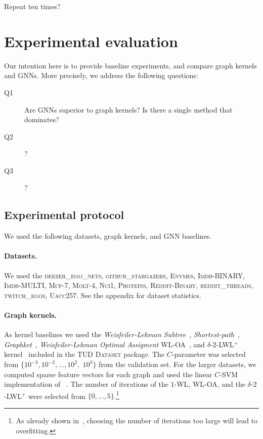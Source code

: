 \documentclass{article}
\theoremstyle{definition}
\newcommand{\new}[1]{\emph{#1}}
\begin{document}
Repeat ten times?



\section{Experimental evaluation}

Our intention here is to provide baseline experiments, and compare graph kernels and GNNs. More precisely, we address the following questions:
\begin{description}
	\item[Q1] Are GNNs superior to graph kernels? Is there a single method that dominates?
	\item[Q2] ?
	\item[Q3] ?
\end{description}

\subsection{Experimental protocol}

We used the following datasets, graph kernels, and GNN baselines.

\paragraph{Datasets.} We used the \textsc{deezer\_ego\_nets}, \textsc{github\_stargazers}, \textsc{Enymes},
\textsc{Imdb-BINARY}, \textsc{Imdb-MULTI}, \textsc{Mcf-7}, \textsc{Molt-4},	\textsc{Nci1}, \textsc{Proteins},
\textsc{Reddit-Binary},	\textsc{reddit\_threads}, \textsc{twitch\_egos}, \textsc{Uacc257}. See the appendix for dataset statistics.

\paragraph{Graph kernels.} As kernel baselines we used the \new{Weisfeiler-Lehman Subtree}~\cite{She+2011}, \new{Shortest-path}~\cite{Bor+2005}, \new{Graphket}~\cite{She+2009}, \new{Weisfeiler-Lehman Optimal Assigment} \textsc{WL-OA}~\cite{Kri+2016}, and $\delta$-$2$-LWL$^+$ kernel~\cite{Mor+2019b} included in the \textsc{TUD Dataset} package. The $C$-parameter was selected from $\{10^{-3}, 10^{-2}, \dotsc, 10^{2},$ $10^{3}\}$ from the validation set. For the larger datasets, we computed sparse feature vectors for each graph and used the linear $C$-SVM implementation of ~\cite{Fan+2008}. The number of iterations of the \textsc{$1$-WL}, \textsc{WL-OA}, and the  $\delta$-$2$-LWL$^+$ were selected from $\{0,\dotsc,5\}$.\footnote{As already shown in~\cite{She+2011}, choosing the number of iterations too large will lead to overfitting.}
\end{document}
